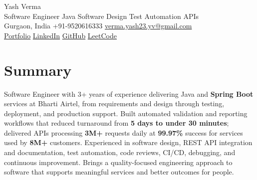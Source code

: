 \documentclass[letterpaper,11pt]{article}
\begin{document}
\begin{center}
  {\Huge Yash Verma} \\
  \small Software Engineer \textperiodcentered{} Java \textperiodcentered{} Software Design \textperiodcentered{} Test Automation \textperiodcentered{} APIs \\
  \vspace{5pt}
  \small Gurgaon, India \textbar{} +91-9520616333 \textbar{}
  \href{mailto:verma.yash23.yv@gmail.com}{verma.yash23.yv@gmail.com} \\
  \vspace{7pt}
  \href{https://yashverma230600.github.io/yash-portfolio/}{Portfolio} \textbar{}
  \href{https://www.linkedin.com/in/yash-verma-9243a7193/}{LinkedIn} \textbar{}
  \href{https://github.com/yashverma230600}{GitHub} \textbar{}
  \href{https://leetcode.com/yashverma230600}{LeetCode}
  \vspace{-8pt}
\end{center}

\section{Summary}
\begin{itemize}[leftmargin=0.15in, label={}]
  \small{\item{
    Software Engineer with 3+ years of experience delivering Java and \textbf{Spring Boot} services at Bharti Airtel, from requirements and design through testing, deployment, and production support. Built automated validation and reporting workflows that reduced turnaround from \textbf{5 days to under 30 minutes}; delivered APIs processing \textbf{3M+} requests daily at \textbf{99.97\%} success for services used by \textbf{8M+} customers. Experienced in software design, REST API integration and documentation, test automation, code reviews, CI/CD, debugging, and continuous improvement. Brings a quality-focused engineering approach to software that supports meaningful services and better outcomes for people.
  }}
\end{itemize}
\vspace{-8pt}

\end{document}
